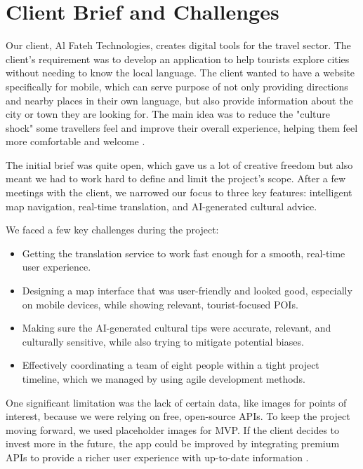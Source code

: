 \section{Client Brief and Challenges}

Our client, Al Fateh Technologies, creates digital tools for the travel sector. The client's requirement was to develop an application to help tourists explore cities without needing to know the local language. The client wanted to have a website specifically for mobile, which can serve purpose of not only providing directions and nearby places in their own language, but also provide information about the city or town they are looking for. The main idea was to reduce the "culture shock" some travellers feel and improve their overall experience, helping them feel more comfortable and welcome \cite{culturegap}.

The initial brief was quite open, which gave us a lot of creative freedom but also meant we had to work hard to define and limit the project's scope. After a few meetings with the client, we narrowed our focus to three key features: intelligent map navigation, real-time translation, and AI-generated cultural advice.

We faced a few key challenges during the project:
\begin{itemize}
\item Getting the translation service to work fast enough for a smooth, real-time user experience.
\item Designing a map interface that was user-friendly and looked good, especially on mobile devices, while showing relevant, tourist-focused POIs.
\item Making sure the AI-generated cultural tips were accurate, relevant, and culturally sensitive, while also trying to mitigate potential biases.
\item Effectively coordinating a team of eight people within a tight project timeline, which we managed by using agile development methods.
\end{itemize}

One significant limitation was the lack of certain data, like images for points of interest, because we were relying on free, open-source APIs. To keep the project moving forward, we used placeholder images for MVP. If the client decides to invest more in the future, the app could be improved by integrating premium APIs to provide a richer user experience with up-to-date information \cite{crowdsourcing}.

